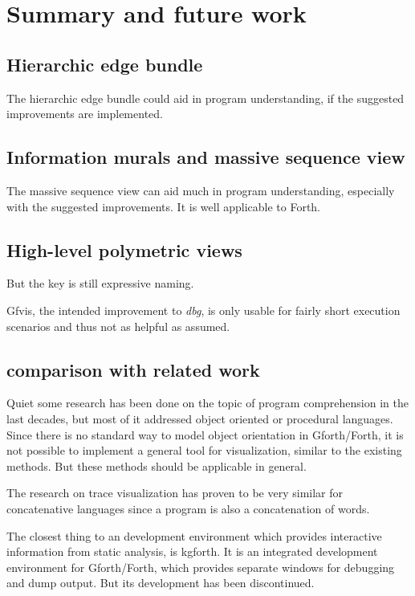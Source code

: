 \chapter{Summary and future work}
\label{chap:Summary}

\section*{Hierarchic edge bundle}
The hierarchic edge bundle could aid in program understanding, if the suggested improvements are implemented.

\section*{Information murals and massive sequence view}
The massive sequence view can aid much in program understanding, especially with the suggested improvements. It is well applicable to Forth.

\section*{High-level polymetric views}


But the key is still expressive naming.


Gfvis, the intended improvement to \emph{dbg}, is only usable for fairly short execution scenarios and thus not as helpful as assumed.


\section{comparison with related work}

Quiet some research has been done on the topic of program comprehension in the last decades, but most of it addressed object oriented or procedural languages. Since there is no standard way to model object orientation in Gforth/Forth, it is not possible to implement a general tool for visualization, similar to the existing methods. But these methods should be applicable in general.

The research on trace visualization has proven to be very similar for concatenative languages since a program is also a concatenation of words.

The closest thing to an development environment which provides interactive information from static analysis, is kgforth. It is an integrated development environment for Gforth/Forth, which provides separate windows for debugging and dump output. But its development has been discontinued.

